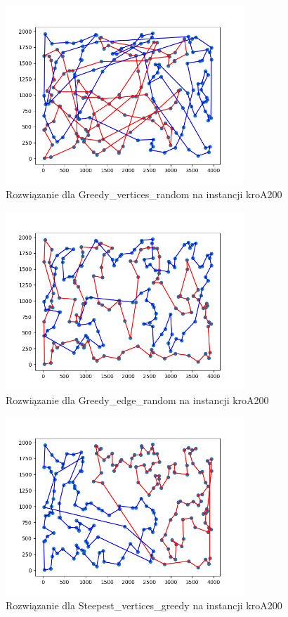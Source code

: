 \documentclass[12pt,a4paper]{article}
\begin{document}
\begin{figure}[H]
\centering
\includegraphics[width=0.8\textwidth]{figures/kroA_Greedy_V_random.png}
\caption{Rozwiązanie dla Greedy\_vertices\_random na instancji kroA200}
\end{figure}

\begin{figure}[H]
\centering
\includegraphics[width=0.8\textwidth]{figures/kroA_Greedy_E_random.png}
\caption{Rozwiązanie dla Greedy\_edge\_random na instancji kroA200}
\end{figure}

\begin{figure}[H]
\centering
\includegraphics[width=0.8\textwidth]{figures/kroA_Steepest_V_greedy.png}
\caption{Rozwiązanie dla Steepest\_vertices\_greedy na instancji kroA200}
\end{figure}
\end{document}
